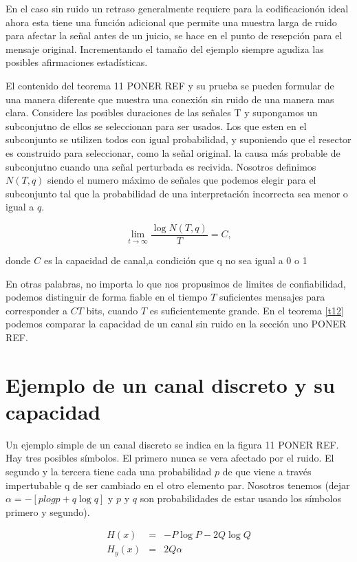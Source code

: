 \documentclass{article}
\begin{document}
En el caso sin ruido un retraso generalmente requiere para la
codificacion\'on ideal ahora esta tiene una funci\'on adicional que
permite una muestra larga de ruido para afectar la se\~{n}al antes de
un juicio, se hace en el punto de resepci\'on para el mensaje
original. Incrementando el tama\~{n}o del ejemplo siempre agudiza las
posibles afirmaciones estad\'isticas.

El contenido del teorema 11 PONER REF y su prueba se pueden formular
de una manera diferente que muestra una conexi\'on sin ruido de una
manera mas clara. Considere las posibles duraciones de las se\~{n}ales
T y supongamos un subconjutno de ellos se seleccionan para ser
usados. Los que esten en el subconjunto se utilizen todos con igual
probabilidad, y suponiendo que el resector es construido para
seleccionar, como la se\~{n}al original. la causa m\'as probable de
subconjutno cuando una se\~{n}al perturbada es recivida. Nosotros
definimos $N(T,q)$ siendo el numero m\'aximo de se\~{n}ales que podemos
elegir para el subconjunto tal que la probabilidad de una
interpretaci\'{o}n incorrecta sea menor o igual a $q$.

\begin{equation}
\lim_{t \to{}\infty}\frac{\log{N}(T,q)}{T} = C,
\end{equation}

donde $C$ es la capacidad de canal,a condici\'on que q no sea igual a
0 o 1


En otras palabras, no importa lo que nos propusimos de limites de
confiabilidad, podemos distinguir de forma fiable en el tiempo $T$
suficientes mensajes para corresponder a $CT$ bits, cuando $T$ es
suficientemente grande. En el teorema \ref{t12} podemos comparar la
capacidad de un canal sin ruido en la secci\'on uno PONER REF.

\section{Ejemplo de un canal discreto y su capacidad}

Un ejemplo simple de un canal discreto se indica en la figura 11 PONER
REF. Hay tres posibles s\'imbolos. El primero nunca se vera afectado por
el ruido. El segundo y la tercera tiene cada una probabilidad $p$ de que
viene a trav\'es impertubable q de ser cambiado en el otro elemento
par. Nosotros tenemos (dejar $\alpha = -[plogp + q\log{q}]$ y $p$ y $q$
son probabilidades de estar usando los s\'imbolos primero y segundo).

\begin{equation}
\begin{array}{rcl}
H(x) &=& -P\log{P} - 2Q\log{Q} \\
H_y(x) &=& 2Q\alpha
\end{array}
\end{equation}
\end{document}
